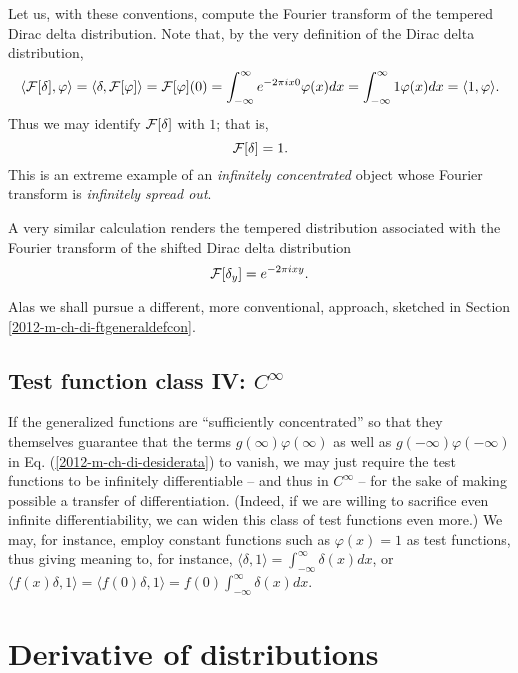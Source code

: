 {
\color{blue}
\bexample
Let us, with these conventions, compute the Fourier transform of the tempered Dirac delta distribution.
Note that, by the very definition of the  Dirac delta distribution,
\begin{equation}
\langle    {\cal F}[\delta  ] , \varphi \rangle
=
\langle   \delta , {\cal F}[\varphi ]\rangle
=
{\cal F}[\varphi](0)=  \int_{-\infty}^\infty  e^{- 2\pi ix 0} \varphi (x) dx  =  \int_{-\infty}^\infty  1 \varphi (x) dx
=  \langle   1 , \varphi \rangle
.
\end{equation}
Thus we may identify  ${\cal F}[\delta  ]$ with $1$; that is,
\begin{equation}
{\cal F}[\delta  ] = 1
.
\end{equation}
This is an extreme example of an {\em infinitely concentrated} object whose Fourier transform is
{\em infinitely spread out}.

A very similar calculation renders the tempered distribution associated with the Fourier transform of the shifted Dirac delta distribution
\begin{equation}
{\cal F}[\delta_y  ] = e^{- 2\pi ix y}
.
\end{equation}
\eexample
}

Alas we shall pursue a different, more conventional, approach, sketched in Section \ref{2012-m-ch-di-ftgeneraldefcon}.

\subsection{Test function class IV: $C^\infty$}

If the generalized functions are ``sufficiently concentrated'' so that they themselves guarantee that the terms
$g(\infty)\varphi(\infty)$ as well as $g(-\infty)\varphi(-\infty)$
in Eq. (\ref{2012-m-ch-di-desiderata}) to vanish,
we may just require the test functions to be infinitely differentiable -- and thus in $C^\infty$ --
for the sake of making possible a transfer of differentiation.
(Indeed, if we are willing to sacrifice even infinite differentiability, we can widen this class of test functions even more.)
We may, for instance, employ constant functions such as $\varphi (x)=1$ as test functions,
thus giving meaning to, for instance,
$\langle \delta , 1\rangle= \int_{-\infty}^\infty \delta (x) dx$,
or
$\langle f(x)\delta , 1\rangle= \langle f(0)\delta , 1\rangle= f(0)\int_{-\infty}^\infty  \delta (x) dx$.

\section{Derivative of distributions}

